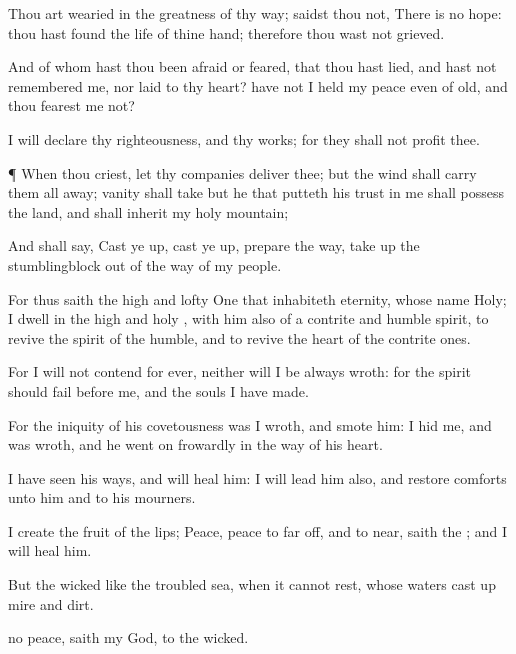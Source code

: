 {Thou art
wearied in the
greatness of thy
way;
{}
saidst thou not, There is no
hope: thou hast
found the
life of thine
hand; therefore thou wast not
grieved.

And of whom hast thou been
afraid or
feared, that thou hast
lied, and hast not
remembered me, nor
laid
{} to thy
heart? have not I held my
peace even of
old, and thou
fearest me not?

I will
declare thy
righteousness, and thy
works; for they shall not
profit thee.


\par }{\PP {}¶ When thou
criest, let thy
companies
deliver thee; but the
wind shall carry them all
away;
vanity shall
take
{} but he that putteth his
trust in me shall
possess the
land, and shall
inherit my
holy
mountain;

And shall
say, Cast ye
up, cast ye
up,
prepare the
way, take
up the
stumblingblock out of the
way of my
people.

For thus
saith the
high and lofty
One that
inhabiteth
eternity, whose
name
{}
Holy; I
dwell in the
high and
holy
{}, with him also
{} of a
contrite and
humble
spirit, to
revive the
spirit of the
humble, and to
revive the
heart of the contrite
ones.

For I will not
contend for
ever, neither will I be
always
wroth: for the
spirit should
fail
before me, and the
souls
{} I have
made.


\par }{\PP {}For the
iniquity of his
covetousness was I
wroth, and
smote him: I
hid me, and was
wroth, and he went
on
frowardly in the
way of his
heart.

I have
seen his
ways, and will
heal him: I will
lead him also, and
restore
comforts unto him and to his
mourners.

I
create the
fruit of the
lips;
Peace,
peace to
{} far
off, and to
{}
near,
saith the
{}; and I will
heal him.

But the
wicked
{} like the
troubled
sea, when it
cannot
rest, whose
waters cast
up
mire and
dirt.

 no
peace,
saith my
God, to the
wicked.




\par }
